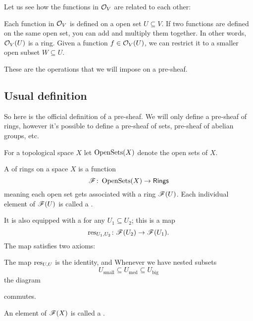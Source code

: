 Let us see how the functions in $\mathcal O_V$ are related to each other:
\begin{itemize}
	\ii Each function in $\mathcal O_V$ is defined on a open set $U \subseteq V$.
	\ii If two functions are defined on the same open set, you can add and
	multiply them together. In other words, $\mathcal O_V(U)$ is a ring.
	\ii Given a function $f \in \mathcal O_V(U)$, we can restrict it to a smaller open
	subset $W \subseteq U$.
\end{itemize}
These are the operations that we will impose on a pre-sheaf.

\subsection{Usual definition}
So here is the official definition of a pre-sheaf.
We will only define a pre-sheaf of rings, however it's possible to define a
pre-sheaf of sets, pre-sheaf of abelian groups, etc.
\begin{definition}
	For a topological space $X$ let $\operatorname{OpenSets}(X)$ denote the open sets of $X$.
\end{definition}
\begin{definition}
	A  of rings on a space $X$ is a function
	\[ \mathscr F \colon \operatorname{OpenSets}(X) \to \mathsf{Rings} \]
	meaning each open set gets associated with a ring $\mathscr F(U)$.
	Each individual element of $\mathscr F(U)$ is called a .

	It is also equipped with a 
	for any $U_1 \subseteq U_2$; this is a map
	\[ \operatorname{res}_{U_1, U_2}
		\colon \mathscr F(U_2) \to \mathscr F(U_1). \]
	The map satisfies two axioms:
	\begin{itemize}
		\ii The map $\operatorname{res}_{U,U}$ is the identity, and
		\ii Whenever we have nested subsets
		\[ U_{\text{small}} \subseteq U_{\text{med}} \subseteq U_{\text{big}} \]
		the diagram
		\begin{center}
		\end{center}
		commutes.
	\end{itemize}
\end{definition}

\begin{definition}
	An element of $\mathscr F(X)$ is called a .
\end{definition}

